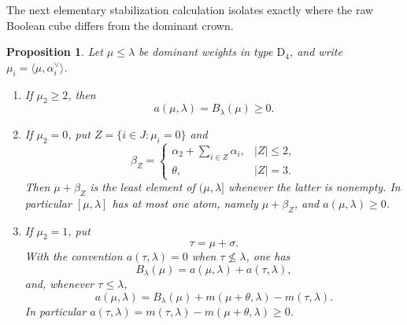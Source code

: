 \documentclass[11pt]{article}
\newtheorem{proposition}[proposition]{Proposition}
\theoremstyle{definition}
\theoremstyle{remark}
\newcommand{\typeD}{\ensuremath{\mathrm{D}}}
\begin{document}
The next elementary stabilization calculation isolates exactly where the raw
Boolean cube differs from the dominant crown.

\begin{proposition}\label{prop:D4-defect}
Let $\mu\le\lambda$ be dominant weights in type $\typeD_4$, and write
$\mu_i=\langle\mu,\alpha_i^\vee\rangle$.
\begin{enumerate}[label=\textnormal{(\roman*)}]
\item If $\mu_2\ge2$, then
\[
             a(\mu,\lambda)=B_\lambda(\mu)\ge0.
\]
\item If $\mu_2=0$, put $Z=\{i\in J:\mu_i=0\}$ and
\[
 \beta_Z=
 \begin{cases}
  \alpha_2+\displaystyle\sum_{i\in Z}\alpha_i,&|Z|\le2,\\[1mm]
  \theta,&|Z|=3.
 \end{cases}
\]
Then $\mu+\beta_Z$ is the least element of $(\mu,\lambda]$ whenever the latter
is nonempty.  In particular $[\mu,\lambda]$ has at most one atom, namely
$\mu+\beta_Z$, and $a(\mu,\lambda)\ge0$.
\item If $\mu_2=1$, put
\[
             \tau=\mu+\sigma.
\]
With the convention $a(\tau,\lambda)=0$ when $\tau\nleq\lambda$, one has
\begin{equation}\label{eq:D4-defect-atomic}
       B_\lambda(\mu)=a(\mu,\lambda)+a(\tau,\lambda),
\end{equation}
and, whenever $\tau\le\lambda$,
\begin{equation}\label{eq:D4-defect-multiplicity}
 a(\mu,\lambda)
   =B_\lambda(\mu)+m(\mu+\theta,\lambda)-m(\tau,\lambda).
\end{equation}
In particular $a(\tau,\lambda)=m(\tau,\lambda)-m(\mu+\theta,\lambda)\ge0$.
\end{enumerate}
\end{proposition}
\end{document}

